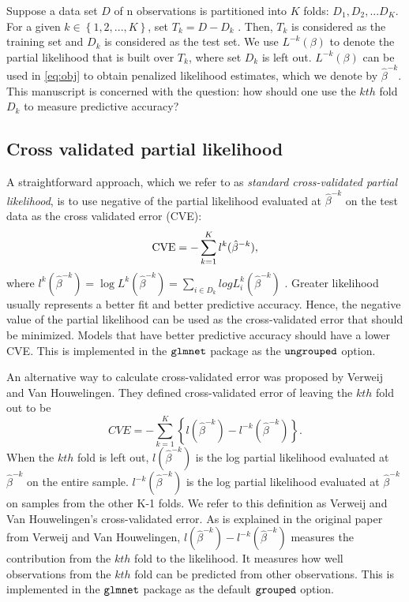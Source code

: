 \par Suppose a data set $D$ of n observations is partitioned into $K$ folds: $D_{1}, D_{2}, ... D_{K}$. For a given $k \in \left\{1,2, ... , K\right\}$, set $T_{k} = D - D_{k}$ . Then, $T_{k}$ is considered as the training set and $D_{k}$ is considered as the test set.  We use $L^{-k}(\beta)$ to denote the partial likelihood that is built over $T_k$, where set $D_{k}$ is left out.   $L^{-k}(\beta)$ can be used in \eqref{eq:obj} to obtain penalized likelihood estimates, which we denote by $\hat{\beta}^{-k}$. This manuscript is concerned with the question: how should one use the $kth$ fold $D_{k}$ to measure predictive accuracy?

\subsection{Cross validated partial likelihood} 
\label{Sec:cox-cv-existing}
\par A straightforward approach, which we refer to as \emph{standard cross-validated partial likelihood}, is to use negative of the partial likelihood evaluated at $\hat{\beta}^{-k}$ on the test data as the cross validated error (CVE):
\begin{equation}
  \textrm{CVE} = - \sum_{k=1}^{K} l^{k}(\hat{\beta}^{-k}),
\end{equation}
where $l^{k}(\hat{\beta}^{-k}) = \log L^{k}(\hat{\beta}^{-k}) = \sum \limits_{i \in D_{k}} log L^{k}_{i}(\hat{\beta}^{-k})$ . Greater likelihood usually represents a better fit and better predictive accuracy. Hence, the negative value of the partial likelihood can be used as the cross-validated error that should be minimized. Models that have better predictive accuracy should have a lower CVE. This is implemented in the $\tt{glmnet}$ package as the $\tt{ungrouped}$ option.

An alternative way to calculate cross-validated error was proposed by Verweij and Van Houwelingen. They defined cross-validated error of leaving the $kth$ fold out to be 
\begin{equation}
	CVE = -\sum_{k = 1}^K \left\{ l(\hat{\beta}^{- k})  - l^{-k}(\hat{\beta}^{- k}) \right\}. 
\end{equation}
When the $kth$ fold is left out, $l(\hat{\beta}^{-k})$ is the log partial likelihood evaluated at $\hat{\beta}^{-k}$ on the entire sample. $l^{-k}(\hat{\beta}^{-k})$ is the log partial likelihood evaluated at $\hat{\beta}^{-k}$ on samples from the other K-1 folds. We refer to this definition as Verweij and Van Houwelingen's cross-validated error. As is explained in the original paper from Verweij and Van Houwelingen, $l(\hat{\beta}^{- k})  - l^{-k}(\hat{\beta}^{- k})$ measures the contribution from the $kth$ fold to the likelihood. It measures how well observations from the $kth$ fold can be predicted from other observations. This is implemented in the $\tt{glmnet}$ package as the default $\tt{grouped}$ option.

